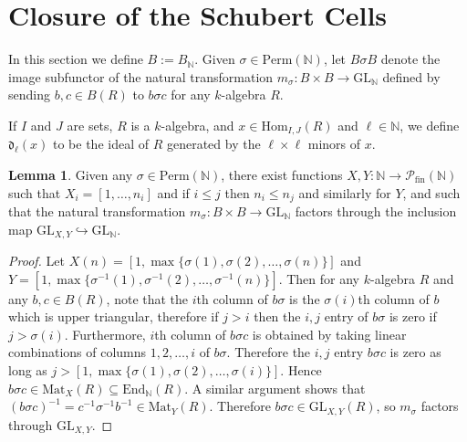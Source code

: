 \documentclass[oneside,11pt]{amsart}
\newcommand{\nn}{\ensuremath{\mathbb{N}}}
\newcommand{\mP}{\ensuremath{\mathcal{P}}}
\newcommand{\fd}{\ensuremath{\mathfrak{d}}}
\newcommand{\Hom}{\ensuremath{\text{Hom}}}
\newcommand{\Mat}{\ensuremath{\text{Mat}}}
\newcommand{\GL}{\ensuremath{\text{GL}}}
\newcommand{\Perm}{\ensuremath{\text{Perm}}}
\newcommand{\End}{\ensuremath{\text{End}}}
\theoremstyle{definition}
\newtheorem{proof techniques}{Proof Techniques}
\newtheorem{lemma}{Lemma}
\begin{document}



\section{Closure of the Schubert Cells}\label{sec: closure of the schubert cells}



In this section we define $B := B_\nn$. Given $\sigma \in \Perm(\nn)$, let $B \sigma B$ denote the image subfunctor of the natural transformation $m_\sigma : B \times B \to \GL_\nn$ defined by sending $b , c \in B(R)$ to $b \sigma c$ for any $k$-algebra $R$. 

If $I$ and $J$ are sets, $R$ is a $k$-algebra, and $x \in \Hom_{I, J}(R)$ and $\ell \in \nn$, we define $\fd_\ell(x)$ to be the ideal of $R$ generated by the $\ell \times \ell$ minors of $x$.  


\begin{lemma} \label{lem: schubert cells contained in affine subfunctors}
Given any $\sigma \in \Perm(\nn)$, there exist functions $X , Y : \nn \to \mP_{\text{fin}}(\nn)$ such that $X_i = [1, \ldots, n_i]$ and if $i \leq j$ then $n_i \leq n_j$ and similarly for $Y$, and such that the natural transformation $m_\sigma: B \times B \to \GL_\nn$ factors through the inclusion map $\GL_{X , Y} \hookrightarrow \GL_\nn$.
\end{lemma}

\begin{proof}
Let $X(n) = [1 ,  \max\{ \sigma(1) , \sigma(2), \ldots, \sigma(n) \} ]$ and $Y = [1 ,  \max\{ \sigma^{-1}(1) , \sigma^{-1}(2), \ldots, \sigma^{-1}(n) \} ]$. Then for any $k$-algebra $R$ and any $b , c \in B(R)$, note that the $i$th column of $b \sigma$ is the $\sigma(i)$th column of $b$ which is upper triangular, therefore if $j > i$ then the $i , j$ entry of $b \sigma$ is zero if $j > \sigma(i)$. Furthermore, $i$th column of $b \sigma c$ is obtained by taking linear combinations of columns $1 , 2 , \ldots , i$ of $b \sigma$. Therefore the $i , j$ entry $b \sigma c$ is zero as long as $j > [1 ,  \max\{ \sigma(1) , \sigma(2), \ldots, \sigma(i) \} ]$. Hence $b \sigma c \in \Mat_X(R) \subseteq \End_\nn(R)$. A similar argument shows that $(b \sigma c)^{-1} = c^{-1} \sigma^{-1} b^{-1} \in \Mat_Y(R)$. Therefore $b \sigma c \in \GL_{X , Y}(R)$, so $m_\sigma$ factors through $\GL_{X, Y}$. 
\end{proof}
\end{document}
